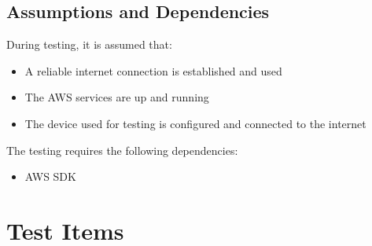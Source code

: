 \documentclass{article}
\begin{document}
	\subsection{Assumptions and Dependencies}
		During testing, it is assumed that:
		\begin{itemize}
			\item A reliable internet connection is established and used
			\item The AWS services are up and running
			\item The device used for testing is configured and connected to the internet
		\end{itemize}
		
		The testing requires the following dependencies:
		\begin{itemize}
			\item AWS SDK
		\end{itemize}

\newpage

\section{Test Items}
\end{document}
